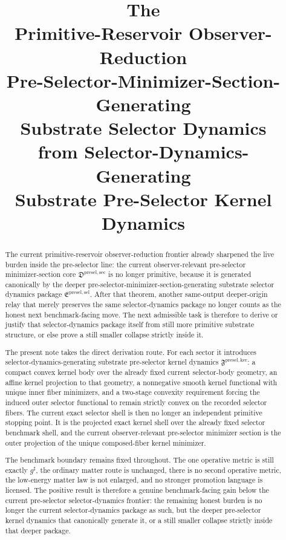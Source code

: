 \documentclass[11pt]{article}
\title{\textbf{The \TheoryName{}}\\[0.4em]
\large Primitive-Reservoir Observer-Reduction\\
\large Pre-Selector-Minimizer-Section-Generating\\
\large Substrate Selector Dynamics\\
\large from Selector-Dynamics-Generating\\
\large Substrate Pre-Selector Kernel Dynamics}
\author{}
\date{}
\newcommand{\CompletedMetric}{g^{\sharp}}
\newcommand{\PreSelectorMinSectionCore}{\mathfrak D^{\mathrm{presel,sec}}}
\newcommand{\PreSectionSelectorPackage}{\mathfrak E^{\mathrm{presel,sel}}}
\newcommand{\KernelPackage}{\mathfrak F^{\mathrm{presel,ker}}}
\begin{document}
\maketitle

\begin{abstract}
The current primitive-reservoir observer-reduction frontier already sharpened the live burden inside the pre-selector line: the current observer-relevant pre-selector minimizer-section core \(\PreSelectorMinSectionCore\) is no longer primitive, because it is generated canonically by the deeper pre-selector-minimizer-section-generating substrate selector dynamics package \(\PreSectionSelectorPackage\). After that theorem, another same-output deeper-origin relay that merely preserves the same selector-dynamics package no longer counts as the honest next benchmark-facing move. The next admissible task is therefore to derive or justify that selector-dynamics package itself from still more primitive substrate structure, or else prove a still smaller collapse strictly inside it.

The present note takes the direct derivation route. For each sector it introduces selector-dynamics-generating substrate pre-selector kernel dynamics \(\KernelPackage\): a compact convex kernel body over the already fixed current selector-body geometry, an affine kernel projection to that geometry, a nonnegative smooth kernel functional with unique inner fiber minimizers, and a two-stage convexity requirement forcing the induced outer selector functional to remain strictly convex on the recorded selector fibers. The current exact selector shell is then no longer an independent primitive stopping point. It is the projected exact kernel shell over the already fixed selector benchmark shell, and the current observer-relevant pre-selector minimizer section is the outer projection of the unique composed-fiber kernel minimizer.

The benchmark boundary remains fixed throughout. The one operative metric is still exactly \(\CompletedMetric\), the ordinary matter route is unchanged, there is no second operative metric, the low-energy matter law is not enlarged, and no stronger promotion language is licensed. The positive result is therefore a genuine benchmark-facing gain below the current pre-selector selector-dynamics frontier: the remaining honest burden is no longer the current selector-dynamics package as such, but the deeper pre-selector kernel dynamics that canonically generate it, or a still smaller collapse strictly inside that deeper package.
\end{abstract}
\end{document}

